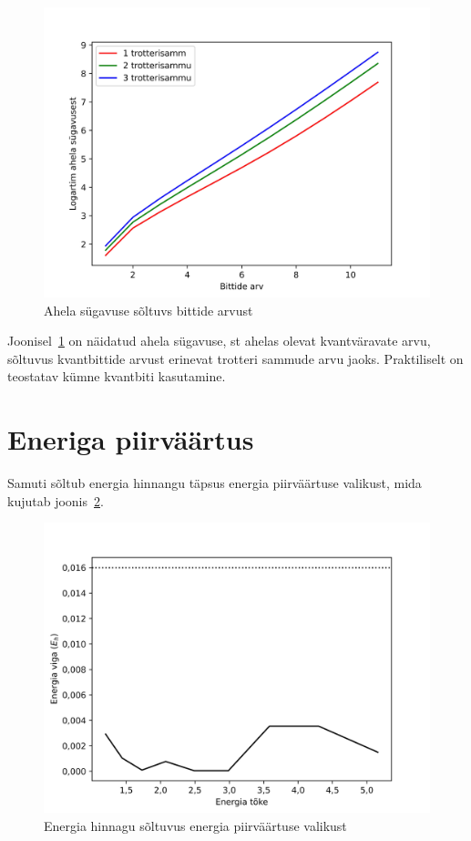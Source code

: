 \documentclass[12pt]{report}
\begin{document}
\begin{figure}[h]
    \centering
    \includegraphics{depths.jpg}
    \caption{Ahela sügavuse sõltuvs bittide arvust}
    \label{fig:depths}
\end{figure}

Joonisel~\ref{fig:depths} on näidatud ahela sügavuse, st ahelas olevat kvantväravate arvu, sõltuvus kvantbittide arvust erinevat trotteri sammude arvu jaoks.
Praktiliselt on teostatav kümne kvantbiti kasutamine.

\section{Eneriga piirväärtus}

Samuti sõltub energia hinnangu täpsus energia piirväärtuse valikust, mida kujutab joonis~\ref{fig:bounds}.

\begin{figure}[h]
    \centering
    \includegraphics{bounds.jpg}
    \caption{Energia hinnagu sõltuvus energia piirväärtuse valikust}
    \label{fig:bounds}
\end{figure}
\end{document}
